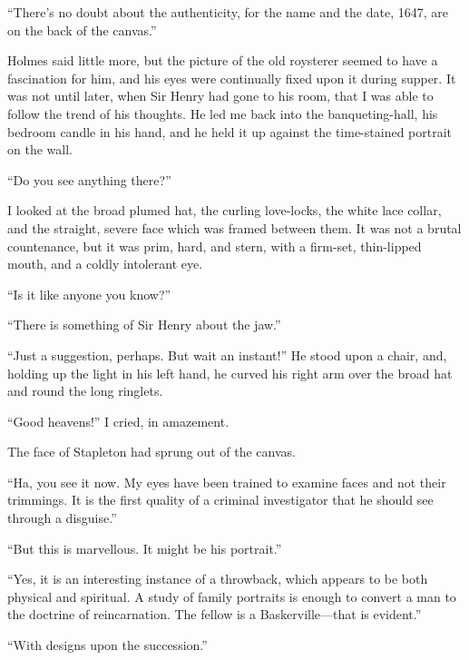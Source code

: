 \documentclass[paper=5.5in:8.5in,BCOR=7mm,twoside,DIV=calc,12pt,usegeometry,openany,chapterprefix,endperiod,headings=big]{scrbook} %
\begin{document}
\enquote{There's no doubt about the authenticity, for the name and the date, 1647, are on the back of the canvas.}

Holmes said little more, but the picture of the old roysterer seemed to have a fascination for him, and his eyes were continually fixed upon it during supper. It was not until later, when Sir Henry had gone to his room, that I was able to follow the trend of his thoughts. He led me back into the banqueting-hall, his bedroom candle in his hand, and he held it up against the time-stained portrait on the wall.

\enquote{Do you see anything there?}

I looked at the broad plumed hat, the curling love-locks, the white lace collar, and the straight, severe face which was framed between them. It was not a brutal countenance, but it was prim, hard, and stern, with a firm-set, thin-lipped mouth, and a coldly intolerant eye.

\enquote{Is it like anyone you know?}

\enquote{There is something of Sir Henry about the jaw.}

\enquote{Just a suggestion, perhaps. But wait an instant!} He stood upon a chair, and, holding up the light in his left hand, he curved his right arm over the broad hat and round the long ringlets.

\enquote{Good heavens!} I cried, in amazement.

The face of Stapleton had sprung out of the canvas.

\enquote{Ha, you see it now. My eyes have been trained to examine faces and not their trimmings. It is the first quality of a criminal investigator that he should see through a disguise.}

\enquote{But this is marvellous. It might be his portrait.}

\enquote{Yes, it is an interesting instance of a throwback, which appears to be both physical and spiritual. A study of family portraits is enough to convert a man to the doctrine of reincarnation. The fellow is a Baskerville---that is evident.}

\enquote{With designs upon the succession.}
\end{document}
